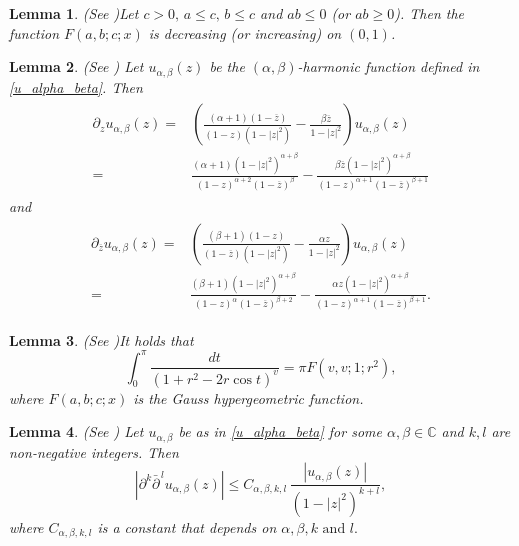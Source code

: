 \documentclass[11pt, reqno]{amsart}
\newtheorem{lemma}{Lemma}
\theoremstyle{definition}
\numberwithin{equation}{section}
\theoremstyle{remark}
\numberwithin{equation}{section}
\begin{document}
     \begin{lemma}{\rm(See \cite{Specialfunctions})}\label{Lemma1}
		Let \(c > 0,\, a \le c,\, b \le c\) and \(ab \le 0\) (or \(ab \ge 0\)). Then the function \(F(a,b;c;x)\) is decreasing (or increasing) on \((0,1)\).
	\end{lemma}

    \begin{lemma}{\rm(See \cite{km})} Let $u_{\alpha,\beta}(z)$ be the $(\alpha,\beta)$-harmonic function  defined in \eqref{u_alpha_beta}. Then
\label{partial derivative of K}
\begin{align*}
\begin{split}
\partial_z u_{\alpha,\beta}(z)=& \left(\frac{(\alpha+1)(1-\overline{z})}{(1-z)\left(1-|z|^2\right)}-\frac{\beta\overline{z}}{1-|z|^2}\right)u_{\alpha,\beta}(z) \\=& \frac{(\alpha + 1)\left(1-|z|^2\right)^{\alpha+\beta}}{(1-z)^{\alpha+2}(1-\overline{z})^\beta} - \frac{\beta \overline{z} \left(1-|z|^2\right)^{\alpha+\beta}}{(1-z)^{\alpha+1}(1-\overline{z})^{\beta+1}}
\end{split}
\end{align*}
and
\begin{align*}
\begin{split}
\partial_{\overline{z}} u_{\alpha,\beta}(z)=& \left(\frac{(\beta+1)(1-z)}{(1-\overline{z})(1-|z|^2)}-\frac{\alpha z}{1-|z|^2}\right)u_{\alpha,\beta}(z)\\=& \frac{(\beta + 1)\left(1-|z|^2\right)^{\alpha+\beta}}{(1-z)^{\alpha}(1-\overline{z})^{\beta+2}} - \frac{\alpha z \left(1-|z|^2\right)^{\alpha+\beta}}{(1-z)^{\alpha+1}(1-\overline{z})^{\beta+1}}.
\end{split}
\end{align*}
\end{lemma}

\begin{lemma}{\rm (See \cite{Specialfunctions})}\label{lem4}
	It holds that $$\int_0^{\pi}\frac{dt}{(1+r^2-2r\cos t)^v}=\pi F\left(v,v;1;r^2\right),$$ where $F(a,b;c;x)$ is the Gauss hypergeometric function.
	\end{lemma}

    \begin{lemma}{\rm(See \cite{Schwarz_for_pq})}{\label{Bound_of_u_alpha_beta}}
	Let $u_{\alpha,\beta}$ be as in \eqref{u_alpha_beta} for some $\alpha,\beta \in \mathbb{C}$ and $k,l$ are non-negative integers. Then
	\[
	\left| \partial^{k} \bar{\partial}^{\,l} u_{\alpha,\beta}(z) \right|
	\leq
	C_{\alpha,\beta,k,l}\,
	\frac{|u_{\alpha,\beta}(z)|}{(1-|z|^2)^{k+l}},
	\]
	where $C_{\alpha,\beta,k,l}$ is a  constant that depends on $\alpha,\beta,k\text{ and }l.$
	\end{lemma}
		
\end{document}
